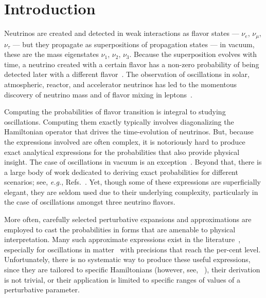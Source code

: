 \documentclass[final,5p,times,twocolumn]{elsarticle}
\newcommand{\eg}{{\it e.g.}}
\providecommand{\Ref}{} %
\newcommand{\Refs}{Refs.}
\begin{document}
\begin{small}
\end{small}


\section{Introduction}\label{Section_Introduction}

Neutrinos are created and detected in weak interactions as flavor states --- $\nu_e$, $\nu_\mu$, $\nu_\tau$ --- but they propagate as superpositions of propagation states --- in vacuum, these are the mass eigenstates $\nu_1$, $\nu_2$, $\nu_3$.  Because the superposition evolves with time, a neutrino created with a certain flavor has a non-zero probability of being detected later with a different flavor\ \cite{Pontecorvo:1967fh, Barger:1980hs, Bilenky:2004sn, Fantini:2018itu}.  The observation of oscillations in solar, atmospheric, reactor, and accelerator neutrinos has led to the momentous discovery of neutrino mass and of flavor mixing in leptons\ \cite{Kajita:2016cak, McDonald:2016ixn}.

Computing the probabilities of flavor transition is integral to studying oscillations.  Computing them exactly typically involves diagonalizing the Hamiltonian operator that drives the time-evolution of neutrinos.  But, because the expressions involved are often complex, it is notoriously hard to produce exact analytical expressions for the probabilities that also provide physical insight.  The case of oscillations in vacuum is an exception\ \cite{Kayser:1981ye, Giunti:2007ry, Tanabashi:2018oca}.  Beyond that, there is a large body of work dedicated to deriving exact probabilities for different scenarios; see, \eg, \Refs\ \cite{Barger:1980tf, Petcov:1987zj, Zaglauer:1988gz, TorrenteLujan:1995qi, Balantekin:1997jp, Coleman:1998ti, Gago:2001xg, Kimura:2002wd, Harrison:2003fi, Kostelecky:2003xn, Kostelecky:2003cr, GonzalezGarcia:2004wg, Blennow:2004qd, Meloni:2009ia, Ando:2009ts, Abe:2014wla, Flores:2015mah, Popov:2018seq}.  Yet, though some of these expressions are superficially elegant, they are seldom used due to their underlying complexity, particularly in the case of oscillations amongst three neutrino flavors.

More often, carefully selected perturbative expansions and approximations are employed to cast the probabilities in forms that are amenable to physical interpretation.  Many such approximate expressions exist in the literature\ \cite{Gago:2002na, Blennow:2008eb, Diaz:2009qk, Meloni:2009ia, Chaves:2018sih}, especially for oscillations in matter\ \cite{Petcov:1986qg, Hirota:1998wv, Cervera:2000kp, Freund:2001pn, Akhmedov:2004ny, Friedland:2006pi, Ioannisian:2008ve, Supanitsky:2008eq, Minakata:2015gra, Flores:2015mah, Li:2016pzm, Denton:2016wmg, Parke:2019vbs} with precisions that reach the per-cent level.  Unfortunately, there is no systematic way to produce these useful expressions, since they are tailored to specific Hamiltonians (however, see, \Ref\ \cite{Denton:2018fex}), their derivation is not trivial, or their application is limited to specific ranges of values of a perturbative parameter.  
\end{document}
